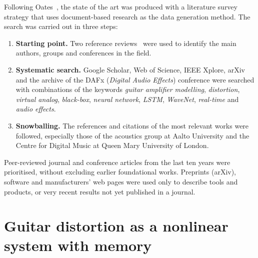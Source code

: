 \documentclass[ENG]{TFUOC}%
\begin{document}
Following Oates~\cite{oates2006}, the state of the art was produced with a literature survey strategy that uses document-based research as the data generation method. The search was carried out in three steps:
\begin{enumerate}[nosep]
    \item \textbf{Starting point.} Two reference reviews~\cite{pakarinen2009,vanhatalo2022} were used to identify the main authors, groups and conferences in the field.
    \item \textbf{Systematic search.} Google Scholar, Web of Science, IEEE Xplore, arXiv and the archive of the DAFx (\emph{Digital Audio Effects}) conference were searched with combinations of the keywords \emph{guitar amplifier modelling}, \emph{distortion}, \emph{virtual analog}, \emph{black-box}, \emph{neural network}, \emph{LSTM}, \emph{WaveNet}, \emph{real-time} and \emph{audio effects}.
    \item \textbf{Snowballing.} The references and citations of the most relevant works were followed, especially those of the acoustics group at Aalto University and the Centre for Digital Music at Queen Mary University of London.
\end{enumerate}
Peer-reviewed journal and conference articles from the last ten years were prioritised, without excluding earlier foundational works. Preprints (arXiv), software and manufacturers' web pages were used only to describe tools and products, or very recent results not yet published in a journal.

\section{Guitar distortion as a nonlinear system with memory}
\label{s:distorsio}
\end{document}
